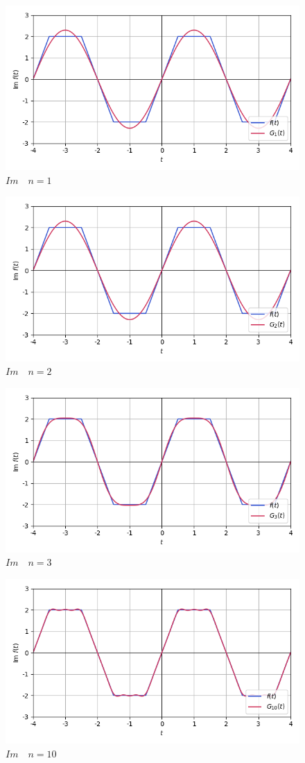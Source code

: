 \documentclass[a4paper]{article}
\begin{document}
\begin{figure}[H]
    \centering
    \includegraphics[width=0.7\linewidth]{param/Im1.png}
    \caption{$Im\quad n = 1$}
\end{figure}
\begin{figure}[H]
    \centering
    \includegraphics[width=0.7\linewidth]{param/Im2.png}
    \caption{$Im\quad n = 2$}
\end{figure}
\begin{figure}[H]
    \centering
    \includegraphics[width=0.7\linewidth]{param/Im3.png}
    \caption{$Im\quad n = 3$}
\end{figure}
\begin{figure}[H]
    \centering
    \includegraphics[width=0.7\linewidth]{param/Im10.png}
    \caption{$Im\quad n = 10$}
\end{figure}
\end{document}
